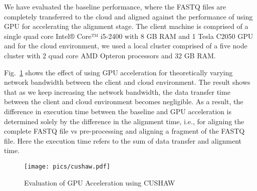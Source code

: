 We have evaluated the baseline performance, where the FASTQ files are completely transferred to the cloud and aligned against the performance of using GPU for accelerating the alignment stage. The client machine is comprised of a single quad core Intel® Core™ i5-2400 with 8 GB RAM and 1 Tesla C2050 GPU and for the cloud environment, we used a local cluster comprised of a five node cluster with 2 quad core AMD Opteron processors and 32 GB RAM.

Fig.~\ref{fig:cushaw} shows the effect of using GPU acceleration for theoretically varying network bandwidth between the client and cloud environment. The result shows that as we keep increasing the network bandwidth, the data transfer time between the client and cloud environment becomes negligible. As a result, the difference in execution time between the baseline and GPU acceleration is determined solely by the difference in the alignment time, i.e., for aligning the complete FASTQ file vs pre-processing and aligning a fragment of the FASTQ file. Here the execution time refers to the sum of data transfer and alignment time.

\begin{figure}[!htb]
  \centering
  \texttt{[image: pics/cushaw.pdf]}
  \caption{Evaluation of GPU Acceleration using CUSHAW}
  \label{fig:cushaw}
\end{figure}


%
%

